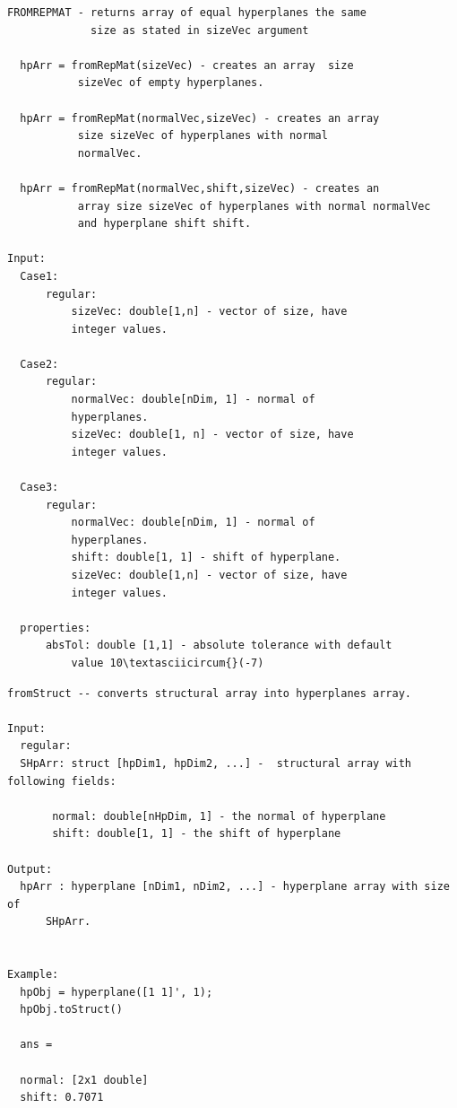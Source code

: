 \documentclass[letterpaper,10pt,english]{sphinxmanual}
\begin{document}
\begin{Verbatim}[commandchars=\\\{\}]
FROMREPMAT - returns array of equal hyperplanes the same
             size as stated in sizeVec argument

  hpArr = fromRepMat(sizeVec) - creates an array  size
           sizeVec of empty hyperplanes.

  hpArr = fromRepMat(normalVec,sizeVec) - creates an array
           size sizeVec of hyperplanes with normal
           normalVec.

  hpArr = fromRepMat(normalVec,shift,sizeVec) - creates an
           array size sizeVec of hyperplanes with normal normalVec
           and hyperplane shift shift.

Input:
  Case1:
      regular:
          sizeVec: double[1,n] - vector of size, have
          integer values.

  Case2:
      regular:
          normalVec: double[nDim, 1] - normal of
          hyperplanes.
          sizeVec: double[1, n] - vector of size, have
          integer values.

  Case3:
      regular:
          normalVec: double[nDim, 1] - normal of
          hyperplanes.
          shift: double[1, 1] - shift of hyperplane.
          sizeVec: double[1,n] - vector of size, have
          integer values.

  properties:
      absTol: double [1,1] - absolute tolerance with default
          value 10\textasciicircum{}(-7)
\end{Verbatim}

\begin{Verbatim}[commandchars=\\\{\}]
fromStruct -- converts structural array into hyperplanes array.

Input:
  regular:
  SHpArr: struct [hpDim1, hpDim2, ...] -  structural array with following fields:

       normal: double[nHpDim, 1] - the normal of hyperplane
       shift: double[1, 1] - the shift of hyperplane

Output:
  hpArr : hyperplane [nDim1, nDim2, ...] - hyperplane array with size of
      SHpArr.


Example:
  hpObj = hyperplane([1 1]', 1);
  hpObj.toStruct()

  ans =

  normal: [2x1 double]
  shift: 0.7071
\end{Verbatim}
\end{document}
